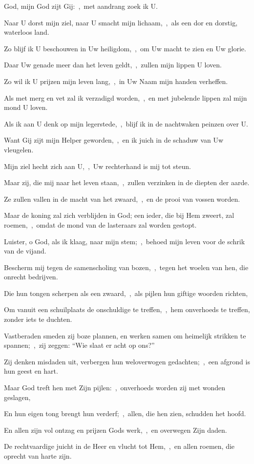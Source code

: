 \documentclass[12pt,twoside,a5paper]{article}
\begin{document}
\begin{halfparskip}
   God, mijn God zijt Gij:~\sep\ met aandrang zoek ik U.

  Naar U dorst mijn ziel, naar U smacht mijn lichaam,~\sep\ als een dor en dorstig, waterloos land.

  Zo blijf ik U beschouwen in Uw heiligdom,~\sep\ om Uw macht te zien en Uw glorie.

  Daar Uw genade meer dan het leven geldt,~\sep\ zullen mijn lippen U loven.

  Zo wil ik U prijzen mijn leven lang,~\sep\ in Uw Naam mijn handen verheffen.

  Als met merg en vet zal ik verzadigd worden,~\sep\ en met jubelende lippen zal mijn mond U loven.

  Als ik aan U denk op mijn legerstede,~\sep\ blijf ik in de nachtwaken peinzen over U.

  Want Gij zijt mijn Helper geworden,~\sep\ en ik juich in de schaduw van Uw vleugelen.

  Mijn ziel hecht zich aan U,~\sep\ Uw rechterhand is mij tot steun.

  Maar zij, die mij naar het leven staan,~\sep\ zullen verzinken in de diepten der aarde.

  Ze zullen vallen in de macht van het zwaard,~\sep\ en de prooi van vossen worden.

  Maar de koning zal zich verblijden in God; een ieder, die bij Hem zweert, zal roemen,~\sep\ omdat de mond van de lasteraars zal worden gestopt.
\end{halfparskip}

\begin{halfparskip}
   Luister, o God, als ik klaag, naar mijn stem;~\sep\ behoed mijn leven voor de schrik van de vijand.

  Bescherm mij tegen de samenscholing van bozen,~\sep\ tegen het woelen van hen, die onrecht bedrijven.

  Die hun tongen scherpen als een zwaard,~\sep\ als pijlen hun giftige woorden richten,

  Om vanuit een schuilplaats de onschuldige te treffen,~\sep\ hem onverhoeds te treffen, zonder iets te duchten.

  Vastberaden smeden zij boze plannen, en werken samen om heimelijk strikken te spannen;~\sep\ zij zeggen: ``Wie slaat er acht op ons?''

  Zij denken misdaden uit, verbergen hun weloverwogen gedachten;~\sep\ een afgrond is hun geest en hart.

  Maar God treft hen met Zijn pijlen:~\sep\ onverhoeds worden zij met wonden geslagen,

  En hun eigen tong brengt hun verderf;~\sep\ allen, die hen zien, schudden het hoofd.

  En allen zijn vol ontzag en prijzen Gods werk,~\sep\ en overwegen Zijn daden.

  De rechtvaardige juicht in de Heer en vlucht tot Hem,~\sep\ en allen roemen, die oprecht van harte zijn.
\end{halfparskip}
\end{document}
